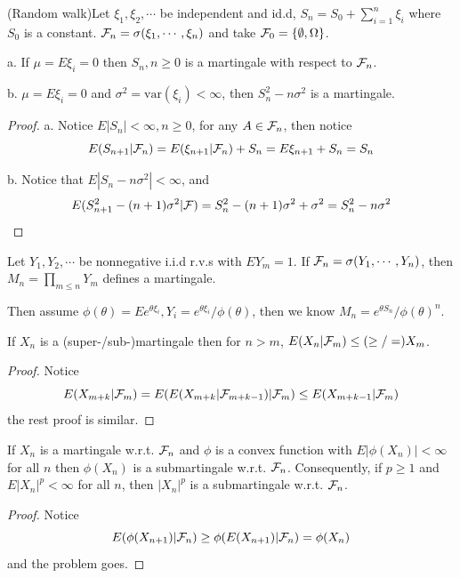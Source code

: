 \begin{example}
    (Random walk)Let $\xi_1,\xi_2,\cdots$ be independent and id.d, $S_n = S_0 +\sum\limits_{i=1}^n \xi_i$ where $S_0$ is a constant. $\mathcal{F}_n = \sigma(\xi_1,\cdots,\xi_n)$ and take $\mathcal{F}_0 = \{\emptyset,\Omega\}$.\par
    a. If $\mu = E\xi_i = 0$ then $S_n, n\geq 0$ is a martingale with respect to $\mathcal{F}_n$.\par
    b. $\mu = E\xi_i = 0$ and $\sigma^2 = \text{var}(\xi_i)<\infty$, then $S_n^2-n\sigma^2$ is a martingale.\par
\end{example}
\begin{proof}\par
    a. Notice $E|S_n| < \infty, n\geq 0$, for any $A \in \mathcal{F}_n$, then notice
    \[E(S_{n+1}|\mathcal{F}_n) = E(\xi_{n+1}|\mathcal{F}_n) + S_n = E\xi_{n+1} + S_n = S_n\]\par
    b. Notice that $E|S_n - n\sigma^2|< \infty$, and
    \[E(S_{n+1}^2-(n+1)\sigma^2|\mathcal{F}) = S_n^2-(n+1)\sigma^2 + \sigma^2 = S_n^2 - n\sigma^2 \]
\end{proof}

\begin{example}
Let $Y_1,Y_2,\cdots$ be nonnegative i.i.d r.v.s with $EY_m = 1$. If $\mathcal{F}_n = \sigma(Y_1,\cdots,Y_n)$, then $M_n = \prod_{m\leq n} Y_m$ defines a martingale.\par
Then assume $\phi(\theta) = Ee^{\theta \xi_i},Y_i = e^{\theta \xi_i}/\phi(\theta)$, then we know $M_n = e^{\theta S_n}/ \phi(\theta)^n$.
\end{example}

\begin{theorem}
    If $X_n$ is a (super-/sub-)martingale then for $n>m$, $E(X_n|\mathcal{F}_m)\leq(\geq/=) X_m$.
\end{theorem}
\begin{proof}
    Notice
    \[E(X_{m+k}|\mathcal{F}_m) = E(E(X_{m+k}|\mathcal{F}_{m+k-1})|\mathcal{F}_m) \leq E(X_{m+k-1}|\mathcal{F}_m)\]
    the rest proof is similar.
\end{proof}

\begin{theorem}
    If $X_n$ is a martingale w.r.t. $\mathcal{F}_n$ and $\phi$ is a convex function with $E|\phi(X_n)| < \infty$ for all $n$ then $\phi(X_n)$ is a submartingale w.r.t. $\mathcal{F}_n$. Consequently, if $p\geq 1$ and $E|X_n|^p < \infty$ for all $n$, then $|X_n|^p$ is a submartingale w.r.t. $\mathcal{F}_n$.
\end{theorem}
\begin{proof}
    Notice
    \[E(\phi(X_{n+1})|\mathcal{F}_n) \geq \phi(E(X_{n+1})|\mathcal{F}_n) = \phi(X_n)\]
    and the problem goes.
\end{proof}

